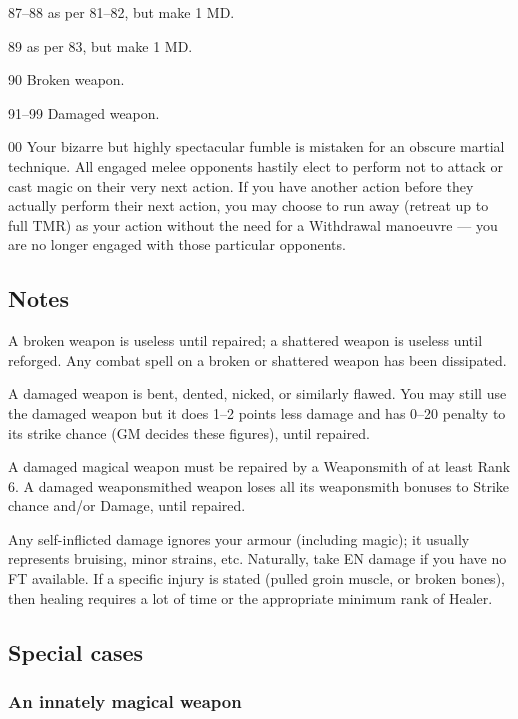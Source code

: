\begin{multicols*}{3}
\begin{Description}
\item[87--88] as per 81--82, but make 1 \x MD.

\item[89] as per 83, but make 1 \x MD.

\item[90] Broken weapon.

\item[91--99] Damaged weapon.

\item[00] Your bizarre but highly spectacular fumble is mistaken for
an obscure martial technique. All engaged melee opponents hastily
elect to perform not to attack or cast magic on their very next
action.  If you have another action before they actually perform their
next action, you may choose to run away (retreat up to full TMR) as
your action without the need for a Withdrawal manoeuvre --- you are no
longer engaged with those particular opponents.
\end{Description}

\subsection{Notes}

A broken weapon is useless until repaired; a shattered weapon is
useless until reforged. Any combat spell on a broken or shattered
weapon has been dissipated.

A damaged weapon is bent, dented, nicked, or similarly flawed.  You
may still use the damaged weapon but it does 1--2 points less damage
and has 0--20 penalty to its strike chance (GM decides these figures),
until repaired.

A damaged magical weapon must be repaired by a Weaponsmith of at least
Rank 6.  A damaged weaponsmithed weapon loses all its weaponsmith
bonuses to Strike chance and/or Damage, until repaired.

Any self-inflicted damage ignores your armour (including magic); it
usually represents bruising, minor strains, etc. Naturally, take EN
damage if you have no FT available. If a specific injury is stated
(\eg pulled groin muscle, or broken bones), then healing requires a
lot of time or the appropriate minimum rank of Healer.

\subsection{Special cases}

\subsubsection{An innately magical weapon}


\end{multicols*}
